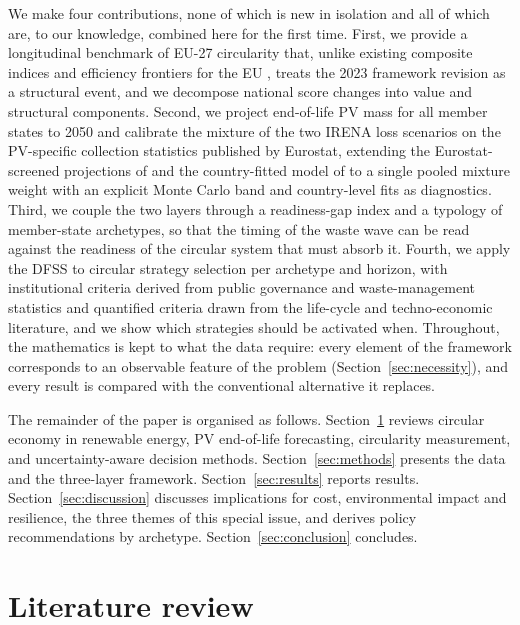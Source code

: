\documentclass[a4paper,fleqn]{cas-sc}
\begin{document}
We make four contributions, none of which is new in isolation and all of which are, to our knowledge, combined here for the first time. First, we provide a longitudinal benchmark of EU-27 circularity that, unlike existing composite indices and efficiency frontiers for the EU \citep{martinezmoreno2023,dadamo2024,kostakis2022}, treats the 2023 framework revision as a structural event, and we decompose national score changes into value and structural components. Second, we project end-of-life PV mass for all member states to 2050 and calibrate the mixture of the two IRENA loss scenarios on the PV-specific collection statistics published by Eurostat, extending the Eurostat-screened projections of \citet{kastanaki2025,kastanaki2026} and the country-fitted model of \citet{pitacco2026} to a single pooled mixture weight with an explicit Monte Carlo band and country-level fits as diagnostics. Third, we couple the two layers through a readiness-gap index and a typology of member-state archetypes, so that the timing of the waste wave can be read against the readiness of the circular system that must absorb it. Fourth, we apply the DFSS to circular strategy selection per archetype and horizon, with institutional criteria derived from public governance and waste-management statistics and quantified criteria drawn from the life-cycle and techno-economic literature, and we show which strategies should be activated when. Throughout, the mathematics is kept to what the data require: every element of the framework corresponds to an observable feature of the problem (Section~\ref{sec:necessity}), and every result is compared with the conventional alternative it replaces.

The remainder of the paper is organised as follows. Section~\ref{sec:lit} reviews circular economy in renewable energy, PV end-of-life forecasting, circularity measurement, and uncertainty-aware decision methods. Section~\ref{sec:methods} presents the data and the three-layer framework. Section~\ref{sec:results} reports results. Section~\ref{sec:discussion} discusses implications for cost, environmental impact and resilience, the three themes of this special issue, and derives policy recommendations by archetype. Section~\ref{sec:conclusion} concludes.

\section{Literature review}\label{sec:lit}
\end{document}
